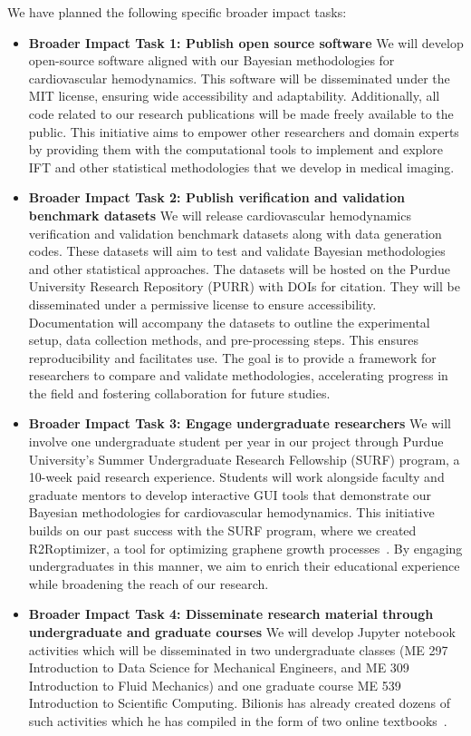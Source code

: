 We have planned the following specific broader impact tasks:
\begin{itemize}[leftmargin=*]
\item \textbf{Broader Impact Task 1: Publish open source software}
We will develop open-source software aligned with our Bayesian methodologies for cardiovascular hemodynamics. 
This software will be disseminated under the MIT license, ensuring wide accessibility and adaptability. 
Additionally, all code related to our research publications will be made freely available to the public. 
This initiative aims to empower other researchers and domain experts by providing them with the computational tools to implement and explore IFT and other statistical methodologies that we develop in medical imaging.

\item \textbf{Broader Impact Task 2: Publish verification and validation benchmark datasets}
We will release cardiovascular hemodynamics verification and validation benchmark datasets along with data generation codes. 
These datasets will aim to test and validate Bayesian methodologies and other statistical approaches. 
The datasets will be hosted on the Purdue University Research Repository (PURR) with DOIs for citation. 
They will be disseminated under a permissive license to ensure accessibility. Documentation will accompany the datasets to outline the experimental setup, data collection methods, and pre-processing steps. 
This ensures reproducibility and facilitates use. 
The goal is to provide a framework for researchers to compare and validate methodologies, accelerating progress in the field and fostering collaboration for future studies.

\item \textbf{Broader Impact Task 3: Engage undergraduate researchers}
We will involve one undergraduate student per year in our project through Purdue University's Summer Undergraduate Research Fellowship (SURF) program, a 10-week paid research experience.
Students will work alongside faculty and graduate mentors to develop interactive GUI tools that demonstrate our Bayesian methodologies for cardiovascular hemodynamics.
This initiative builds on our past success with the SURF program, where we created R2Roptimizer, a tool for optimizing graphene growth processes~\cite{26898}. 
By engaging undergraduates in this manner, we aim to enrich their educational experience while broadening the reach of our research.

\item \textbf{Broader Impact Task 4: Disseminate research material through undergraduate and graduate courses}
We will develop Jupyter notebook activities which will be disseminated in two undergraduate classes (ME 297 Introduction to Data Science for Mechanical Engineers, and ME 309 Introduction to Fluid Mechanics) and one graduate course ME 539 Introduction to Scientific Computing.
Bilionis has already created dozens of such activities which he has compiled in the form of two online textbooks~\cite{ME297-textbook,ME539-textbook}.


\end{itemize}
